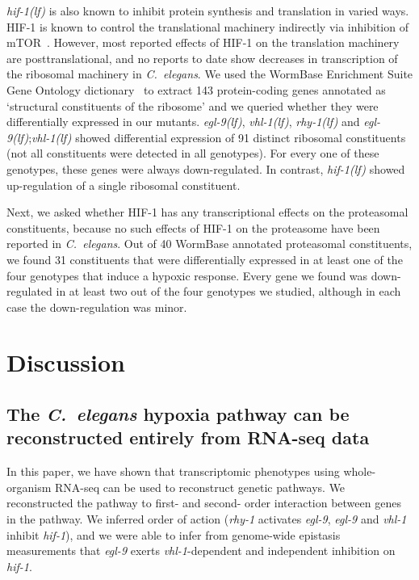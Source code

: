 \documentclass[9pt,twocolumn,twoside]{pnas-new}
\newcommand{\cel}{\emph{C.~elegans}}
\newcommand{\gene}[1]{\emph{#1}}
\newcommand{\egl}{\emph{egl-9(lf)}}
\newcommand{\rhy}{\emph{rhy-1(lf)}}
\newcommand{\vhl}{\emph{vhl-1(lf)}}
\newcommand{\hif}{\emph{hif-1(lf)}}
\newcommand{\hifp}{HIF-1}
\begin{document}
\hif{} is also known to inhibit protein synthesis and translation in varied ways.
\hifp{} is known to control the translational machinery indirectly
via inhibition of mTOR~\cite{Brugarolas2004}. However, most reported effects of
\hifp{} on the translation machinery are posttranslational, and no reports to date
show decreases in transcription of the ribosomal machinery in \cel{}. We used
the WormBase Enrichment Suite Gene Ontology dictionary~\cite{} to extract 143
protein-coding genes annotated as `structural constituents of the ribosome' and
we queried whether they were differentially expressed in our mutants. \egl{},
\vhl{}, \rhy{} and \egl{};\vhl{} showed differential expression of 91 distinct
ribosomal constituents (not all constituents were detected in all genotypes).
For every one of these genotypes, these genes were always down-regulated. In
contrast, \hif{} showed up-regulation of a single ribosomal constituent.

Next, we asked whether \hifp{} has any transcriptional effects on the
proteasomal constituents, because no such effects of \hifp{} on the proteasome
have been reported in \cel{}. Out of 40 WormBase annotated proteasomal constituents,
we found 31 constituents that were differentially expressed in at least one of the
four genotypes that induce a hypoxic response. Every gene we found was down-regulated
in at least two out of the four genotypes we studied, although in each case the
down-regulation was minor.

\section*{Discussion}
\subsection*{The \cel{} hypoxia pathway can be reconstructed entirely from
             RNA-seq data}
In this paper, we have shown that transcriptomic phenotypes using whole-organism
RNA-seq can be used to reconstruct genetic pathways. We reconstructed the
pathway to first- and second- order interaction between genes in the pathway.
We inferred order of action (\gene{rhy-1} activates \gene{egl-9}, \gene{egl-9} and
\gene{vhl-1} inhibit \gene{hif-1}), and we were able to infer from genome-wide
epistasis measurements that \gene{egl-9} exerts \gene{vhl-1}-dependent and
independent inhibition on \gene{hif-1}.
\end{document}
